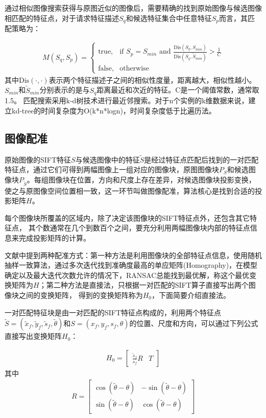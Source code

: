\documentclass[UTF8]{csoarticle}
\begin{document}
通过相似图像搜索获得与原图近似的图像后，需要精确的找到原始图像与候选图像相匹配的特征点，对于请求特征描述\(S_q\)和候选特征集合中任意特征\(S_p\)而言，其匹配策略为：

\begin{align}
  M(S_q,S_p) = 
\begin{cases} 
\text{true}, & \mbox{if } S_p = S_{min}\text{ and }\frac{\text{Dis}(S_q,S_{min})}{\text{Dis}(S_q,\tilde{S}_{min})} > \frac{1}{C} \\
\text{false}, & \mbox{otherwise}
\end{cases}
\end{align}
其中\(\text{Dis}(\cdot,\cdot)\)表示两个特征描述子之间的相似性度量，距离越大，相似性越小。\(S_{min}\)和\(\tilde{S}_{min}\)分别表示的是与\(S_q\)距离最近和次近的特征。C是一个阈值常数，通常取1.5。%
匹配搜索采用k-d树技术进行最近邻搜索。对于n个实例的k维数据来说，建立kd-tree的时间复杂度为O(k*n*logn)，时间复杂度低于比遍历法。

\subsection{图像配准}
原始图像的SIFT特征\(S\)与候选图像中的特征\(\tilde{S}\)是经过特征点匹配后找到的一对匹配特征点，通过它们可得到两幅图像上一组对应的图像块，原图图像块\(P_S\)和候选图像块\(P_{\tilde{S}}\)。每组图像块在位置，方向和尺度上存在差异，对候选图像块投影变换，使之与原图像空间位置相一致，这一环节叫做图像配准，算法核心是找到合适的投影矩阵\(H\)。

每个图像块所覆盖的区域内，除了决定该图像块的SIFT特征点外，还包含其它特征点，
其个数通常在几个到数百个之间，要充分利用两幅图像块内部的特征点信息来完成投影矩阵的计算。

文献\cite{Dai:2012vn}中提到两种配准方式：第一种方法是利用图像块的全部特征点信息，使用随机抽样一致算法，通过多次迭代找到准确度最高的单应矩阵(Homography)，在模型确定以及最大迭代次数允许的情况下，RANSAC总能找到最优解，称这个最优变换矩阵为\(H\)；第二种方法是直接法，只根据一对匹配的SIFT算子直接写出两个图像块之间的变换矩阵，%
得到的变换矩阵称为\(H_0\)，下面简要介绍直接法。

一对匹配特征块是由一对匹配的SIFT特征点构成的，利用两个特征点\(\tilde{S}=(\tilde{x}_f,\tilde{y}_f,\tilde{s}_f,\tilde{\theta})\)和\(S=(x_f,y_f,s_f,\theta)\)的位置、尺度和方向，可以通过下列公式直接写出变换矩阵\(H_0\)：

\begin{align}
  H_0 = 
  \begin{bmatrix}
  \frac{\tilde{s}_f}{s_f} R & T
  \end{bmatrix}
\end{align}
其中
\begin{align}
  R = 
  \begin{bmatrix}
    \cos{(\tilde{\theta}-\theta)} & -\sin{(\tilde{\theta}-\theta)} \\
    \sin{(\tilde{\theta}-\theta)} & \cos{(\tilde{\theta}-\theta)} 
  \end{bmatrix}
\end{align}
\end{document}
